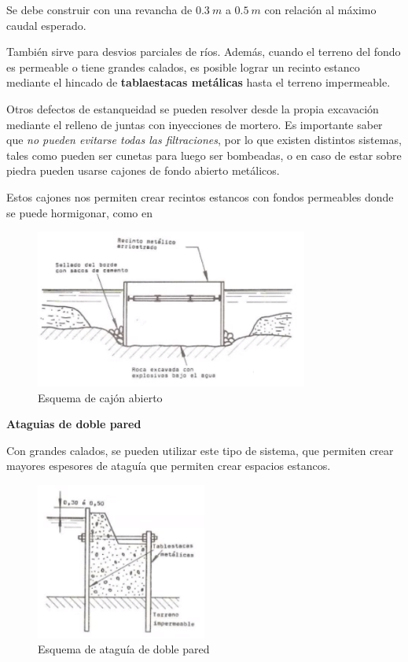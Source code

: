 \documentclass[../main.tex]{subfiles}
\begin{document}
Se debe construir con una revancha de $\SI{0.3}{m}$ a $\SI{0.5}{m}$ con relación
al máximo caudal esperado.

También sirve para desvios parciales de ríos. Además, cuando el terreno del 
fondo es permeable o tiene grandes calados, es posible lograr un recinto estanco
mediante el hincado de \textbf{tablaestacas metálicas} hasta el terreno impermeable.

Otros defectos de estanqueidad se pueden resolver desde la propia excavación
mediante el relleno de juntas con inyecciones de mortero. Es importante saber que 
\textit{no pueden evitarse todas las filtraciones}, por lo que existen distintos
sistemas, tales como pueden ser cunetas para luego ser bombeadas, o en caso de
estar sobre piedra pueden usarse cajones de fondo abierto metálicos.

Estos cajones nos permiten crear recintos estancos con fondos permeables donde se 
puede hormigonar, como en 

\begin{figure}[htpb]
  \centering
  \includegraphics[width=0.8\textwidth]{../images/20210419/ataguia-cajon}
  \caption{Esquema de cajón abierto}
  \label{fig:ataguia-cajon}
\end{figure}    

\textbf{Ataguias de doble pared}

Con grandes calados, se pueden utilizar este tipo de sistema, que permiten crear
mayores espesores de ataguía que permiten crear espacios estancos. 

\begin{figure}[h]
  \centering
  \includegraphics[width=0.5\textwidth]{../images/20210419/ataguia-doble}
  \caption{Esquema de ataguía de doble pared}
  \label{fig:ataguia-doble}
\end{figure}
\end{document}
